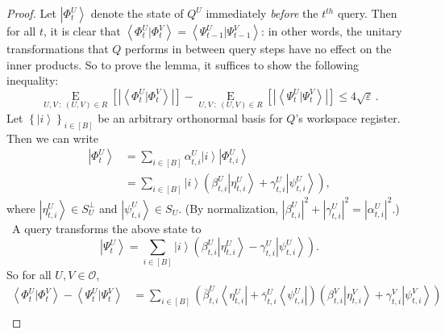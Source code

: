 \begin{proof}
Let $\left\vert \Phi_{t}^{U}\right\rangle $ denote the state of $Q^{U}%
$ immediately \emph{before} the $t^{th}$ query. Then for all $t$, it is
clear that $\left\langle \Phi_{t}^{U}|\Phi_{t}^{V}\right\rangle =\left\langle
\Psi_{t-1}^{U}|\Psi_{t-1}^{V}\right\rangle $: in other words, the unitary
transformations that $Q$ performs in between query steps have no effect on
the inner products. So to prove the lemma, it suffices to show the following
inequality:%
\begin{equation}
\operatorname*{E}_{U,V~:~\left(  U,V\right)  \in R}\left[  \left\vert
\left\langle \Phi_{t}^{U}|\Phi_{t}^{V}\right\rangle \right\vert \right]
-\operatorname*{E}_{U,V~:~\left(  U,V\right)  \in R}\left[  \left\vert
\left\langle \Psi_{t}^{U}|\Psi_{t}^{V}\right\rangle \right\vert \right]
\leq4\sqrt{\varepsilon}\,. \tag{*}%
\end{equation}
Let $\left\{  \left\vert i\right\rangle \right\}  _{i\in\left[  B\right]  }%
$ be an arbitrary orthonormal basis for $Q$'s workspace register. Then we
can write%
\begin{align*}
\left\vert \Phi_{t}^{U}\right\rangle  &  =\sum_{i\in\left[  B\right]  }%
\alpha_{t,i}^{U}\left\vert i\right\rangle \left\vert \Phi_{t,i}^{U}%
\right\rangle \\
&  =\sum_{i\in\left[  B\right]  }\left\vert i\right\rangle \left(  \beta
_{t,i}^{U}\left\vert \eta_{t,i}^{U}\right\rangle +\gamma_{t,i}^{U}\left\vert
\psi_{t,i}^{U}\right\rangle \right)  ,
\end{align*}
where $\left\vert \eta_{t,i}^{U}\right\rangle \in S_{U}^{\bot}$ and
$\left\vert \psi_{t,i}^{U}\right\rangle \in S_{U}$. (By normalization,
$\left\vert \beta_{t,i}^{U}\right\vert ^{2}+\left\vert \gamma_{t,i}%
^{U}\right\vert ^{2}=\left\vert \alpha_{t,i}^{U}\right\vert ^{2}$.) \ A query
transforms the above state to%
\[
\left\vert \Psi_{t}^{U}\right\rangle =\sum_{i\in\left[  B\right]  }\left\vert
i\right\rangle \left(  \beta_{t,i}^{U}\left\vert \eta_{t,i}^{U}\right\rangle
-\gamma_{t,i}^{U}\left\vert \psi_{t,i}^{U}\right\rangle \right)  .
\]
So for all $U,V\in\mathcal{O}$,%
\begin{align*}
\left\langle \Phi_{t}^{U}|\Phi_{t}^{V}\right\rangle -\left\langle \Psi_{t}%
^{U}|\Psi_{t}^{V}\right\rangle  &  =\sum_{i\in\left[  B\right]  }\left(
\overline{\beta}_{t,i}^{U}\left\langle \eta_{t,i}^{U}\right\vert
+\overline{\gamma}_{t,i}^{U}\left\langle \psi_{t,i}^{U}\right\vert \right)
\left(  \beta_{t,i}^{V}\left\vert \eta_{t,i}^{V}\right\rangle +\gamma
_{t,i}^{V}\left\vert \psi_{t,i}^{V}\right\rangle \right) \\

\end{align*}
\end{proof}
